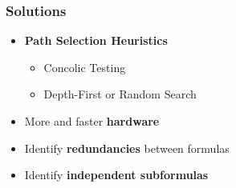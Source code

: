 \begin{frame}
	\frametitle{Solutions}
	\begin{itemize}
		\item \textbf{Path Selection Heuristics}
		\begin{itemize}
			\item Concolic Testing
			\item Depth-First or Random Search
		\end{itemize}
		\item More and faster \textbf{hardware}
		\item Identify \textbf{redundancies} between formulas
		\item Identify \textbf{independent subformulas}
	\end{itemize}
\end{frame}